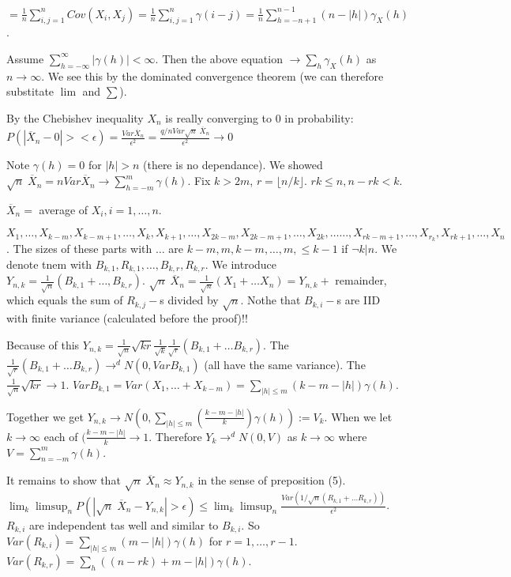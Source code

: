 \documentclass[12pt,a4paper]{amsart}
\theoremstyle{definition} %
\theoremstyle{plain} %
\begin{document}
$= \frac{1}{n} \sum_{i,j = 1}^n Cov(X_i, X_j) = \frac{1}{n} \sum_{i,j = 1}^n \gamma(i-j) = \frac{1}{n} \sum_{h = -n + 1}^{n-1}(n - |h|)\gamma_X(h)$.

Assume $\sum_{h=-\infty}^\infty |\gamma(h)| < \infty$. Then the above equation $\rightarrow \sum_h \gamma_X(h)$ as $n \rightarrow \infty$. We see this by the dominated convergence theorem (we can therefore substitate $\lim$ and $\sum$). 

By the Chebishev inequality $X_n$ is really converging to $0$ in probability: $P(|\overline{X}_n - 0| > <\epsilon ) = \frac{Var \overline{X}_n}{\epsilon^2} = \frac{q/n Var \sqrt{n}\; \overline{X}_n}{\epsilon^2} \rightarrow 0$

\proof
Note $\gamma(h) = 0$ for $|h| > n$ (there is no dependance). We showed $\sqrt{n} \; \overline{X}_n = n Var \overline{X}_n \rightarrow \sum_{h=-m}^m \gamma(h)$. Fix $k > 2m$, $r = \lfloor n/k \rfloor$. $r k \leq n, n - rk < k$. 

$\overline{X}_n = $ average of $X_i, i = 1,\dots,n$.

$X_1, \dots, X_{k-m}, X_{k-m+1}, \dots, X_{k}, X_{k+1}, \dots, X_{2k-m}, X_{2k-m+1},\dots,X_{2k}, \dots \dots, X_{rk-m+1}, \dots, X_{r_k}, X_{rk+1},\dots,X_{n}$. The sizes of these parts with $\dots$ are $k-m, m, k-m, \dots, m, \leq k-1$ if $\neg k | n$. We denote tnem with $B_{k,1}, R_{k,1}, \dots, B_{k, r}, R_{k, r}$. We introduce $Y_{n,k} = \frac{1}{\sqrt{n}} (B_{k, 1} + \dots, B_{k,r})$. $\sqrt{n} \; \overline{X}_n = \frac{1}{\sqrt{n}} (X_1 + \dots X_n) = Y_{n, k} + $ remainder, which equals the sum of $R_{k,j}-$s divided by $\sqrt{n}$. Nothe that $B_{k,i}-$s are IID with finite variance (calculated before the proof)!! 

Because of this $Y_{n,k} = \frac{1}{\sqrt{n}} \sqrt{kr} \frac{1}{\sqrt{k}} \frac{1}{\sqrt{r}} (B_{k,1} + \dots B_{k,r})$. The $ \frac{1}{\sqrt{r}} (B_{k,1} + \dots B_{k,r}) \rightarrow^d N(0, Var B_{k,1})$ (all have the same variance). The $\frac{1}{\sqrt{n}} \sqrt{kr} \rightarrow 1$. $Var B_{k,1} = Var(X_1, \dots + X_{k-m}) = \sum_{|h| \leq m}(k-m-|h|)\gamma(h)$.

Together we get $Y_{n,k} \rightarrow N(0, \sum_{|h| \leq m}(\frac{k-m-|h|}{k})\gamma(h)) := V_k$. When we let $k \rightarrow \infty$ each of $(\frac{k-m-|h|}{k} \rightarrow 1$. Therefore $Y_k \rightarrow^d N(0, V)$ as $k \rightarrow \infty$ where $V = \sum_{n = -m}^m \gamma(h)$. 

It remains to show that $\sqrt{n}\; \overline{X}_n \approx Y_{n,k}$ in the sense of preposition (5). $\lim_k \limsup_n P(|\sqrt{n}\; \overline{X}_n - Y_{n, k}| > \epsilon) \leq \lim_k \limsup_n \frac{Var(1/\sqrt{n}(R_{k,1} + \dots R_{k,r}))}{\epsilon^2}$. $R_{k,i}$ are independent tas well and similar to $B_{k,i}$. So $Var(R_{k,i}) = \sum_{|h| \leq m}(m- |h|)\gamma(h)$ for $r = 1, \dots, r-1$. $Var(R_{k,r}) = \sum_h ((n -rk) + m - |h|)\gamma(h)$. 
\end{document}
